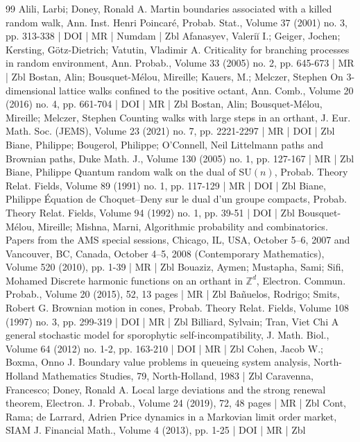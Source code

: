\documentclass[10pt]{amsart}
\theoremstyle{definition}\newtheorem{defi}[theo]{Definition}\newtheorem{rema}[theo]{Remark}\newtheorem{exam}[theo]{Example}\newtheorem{exem}[theo]{Example}\newtheorem{nota}[theo]{Notation}
\begin{document}
\begin{thebibliography}{99}
Alili, Larbi; Doney, Ronald A. Martin boundaries associated with a killed random walk, Ann. Inst. Henri Poincaré, Probab. Stat., Volume 37 (2001) no. 3, pp. 313-338 | DOI | MR | Numdam | Zbl
Afanasyev, Valeriĭ I.; Geiger, Jochen; Kersting, Götz-Dietrich; Vatutin, Vladimir A. Criticality for branching processes in random environment, Ann. Probab., Volume 33 (2005) no. 2, pp. 645-673 | MR | Zbl
Bostan, Alin; Bousquet-Mélou, Mireille; Kauers, M.; Melczer, Stephen On $3$-dimensional lattice walks confined to the positive octant, Ann. Comb., Volume 20 (2016) no. 4, pp. 661-704 | DOI | MR | Zbl
Bostan, Alin; Bousquet-Mélou, Mireille; Melczer, Stephen Counting walks with large steps in an orthant, J. Eur. Math. Soc. (JEMS), Volume 23 (2021) no. 7, pp. 2221-2297 | MR | DOI | Zbl
Biane, Philippe; Bougerol, Philippe; O’Connell, Neil Littelmann paths and Brownian paths, Duke Math. J., Volume 130 (2005) no. 1, pp. 127-167 | MR | Zbl
Biane, Philippe Quantum random walk on the dual of SU$(n)$, Probab. Theory Relat. Fields, Volume 89 (1991) no. 1, pp. 117-129 | MR | DOI | Zbl
Biane, Philippe Équation de Choquet–Deny sur le dual d’un groupe compacts, Probab. Theory Relat. Fields, Volume 94 (1992) no. 1, pp. 39-51 | DOI | Zbl
Bousquet-Mélou, Mireille; Mishna, Marni, Algorithmic probability and combinatorics. Papers from the AMS special sessions, Chicago, IL, USA, October 5–6, 2007 and Vancouver, BC, Canada, October 4–5, 2008 (Contemporary Mathematics), Volume 520 (2010), pp. 1-39 | MR | Zbl
Bouaziz, Aymen; Mustapha, Sami; Sifi, Mohamed Discrete harmonic functions on an orthant in $\mathbb{Z}^d$, Electron. Commun. Probab., Volume 20 (2015), 52, 13 pages | MR | Zbl
Bañuelos, Rodrigo; Smits, Robert G. Brownian motion in cones, Probab. Theory Relat. Fields, Volume 108 (1997) no. 3, pp. 299-319 | DOI | MR | Zbl
Billiard, Sylvain; Tran, Viet Chi A general stochastic model for sporophytic self-incompatibility, J. Math. Biol., Volume 64 (2012) no. 1-2, pp. 163-210 | DOI | MR | Zbl
Cohen, Jacob W.; Boxma, Onno J. Boundary value problems in queueing system analysis, North-Holland Mathematics Studies, 79, North-Holland, 1983 | Zbl
Caravenna, Francesco; Doney, Ronald A. Local large deviations and the strong renewal theorem, Electron. J. Probab., Volume 24 (2019), 72, 48 pages | MR | Zbl
Cont, Rama; de Larrard, Adrien Price dynamics in a Markovian limit order market, SIAM J. Financial Math., Volume 4 (2013), pp. 1-25 | DOI | MR | Zbl

\end{thebibliography}
\end{document}
